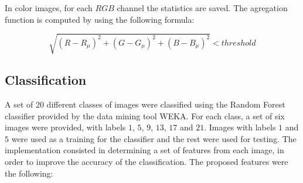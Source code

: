\documentclass{IEEEtran}
\begin{document}
In color images, for each $RGB$ channel the statistics are saved. The agregation
function is computed by using the following formula:

\begin{equation}
\sqrt{(R - R_{\mu})^2 + (G - G_{\mu})^2 + (B - B_{\mu})^2} < threshold
\end{equation}

\subsection{Classification}

A set of 20 different classes of images were classified using the Random Forest classifier provided by the data mining tool WEKA. For each class, a set of six images were provided, with labels $1$, $5$, $9$, $13$, $17$ and $21$. Images with labels $1$ and $5$ were used as a training for the classifier and the rest were used for testing. The implementation consisted in determining a set of features from each image, in order to improve the accuracy of the classification. The proposed features were the following:
\end{document}
